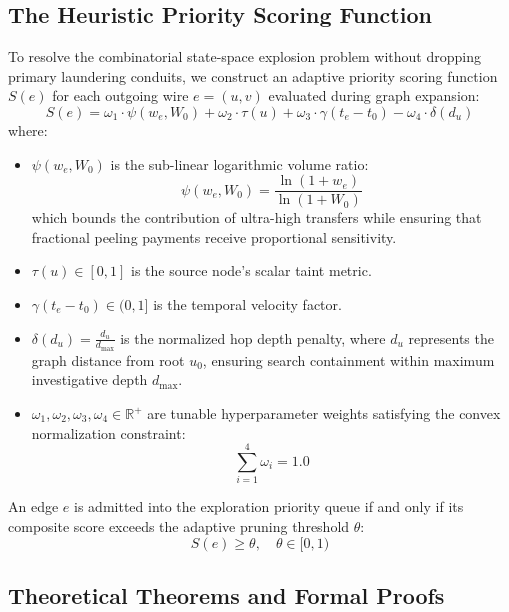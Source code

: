\subsection{The Heuristic Priority Scoring Function}

To resolve the combinatorial state-space explosion problem without dropping primary laundering conduits, we construct an adaptive priority scoring function $S(e)$ for each outgoing wire $e = (u, v)$ evaluated during graph expansion:
\begin{equation}
    S(e) = \omega_1 \cdot \psi(w_e, W_0) + \omega_2 \cdot \tau(u) + \omega_3 \cdot \gamma(t_e - t_0) - \omega_4 \cdot \delta(d_u)
    \label{eq:priority_formula}
\end{equation}
where:
\begin{itemize}
    \item $\psi(w_e, W_0)$ is the sub-linear logarithmic volume ratio:
    \begin{equation}
        \psi(w_e, W_0) = \frac{\ln(1 + w_e)}{\ln(1 + W_0)}
    \end{equation}
    which bounds the contribution of ultra-high transfers while ensuring that fractional peeling payments receive proportional sensitivity.
    \item $\tau(u) \in [0, 1]$ is the source node's scalar taint metric.
    \item $\gamma(t_e - t_0) \in (0, 1]$ is the temporal velocity factor.
    \item $\delta(d_u) = \frac{d_u}{d_{\max}}$ is the normalized hop depth penalty, where $d_u$ represents the graph distance from root $u_0$, ensuring search containment within maximum investigative depth $d_{\max}$.
    \item $\omega_1, \omega_2, \omega_3, \omega_4 \in \mathbb{R}^+$ are tunable hyperparameter weights satisfying the convex normalization constraint:
    \begin{equation}
        \sum_{i=1}^{4} \omega_i = 1.0
    \end{equation}
\end{itemize}

An edge $e$ is admitted into the exploration priority queue if and only if its composite score exceeds the adaptive pruning threshold $\theta$:
\begin{equation}
    S(e) \ge \theta, \quad \theta \in [0, 1)
\end{equation}

\subsection{Theoretical Theorems and Formal Proofs}

